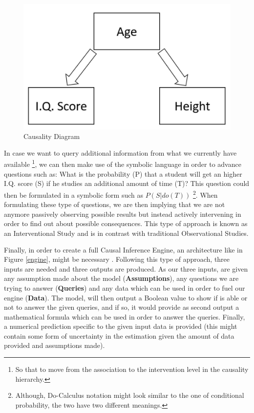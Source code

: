 \begin{figure}[ht!]%
    \centering
    \includegraphics[width=0.4\linewidth]{latex/images/caus_d.pdf}
    \vspace{-0.2cm}
    \caption{Causality Diagram}
    \label{dig_ex}
\end{figure}
\vspace{-0.5cm}

In case we want to query additional information from what we currently have available \footnote{So that to move from the association to the intervention level in the causality hierarchy.}, we can then make use of the symbolic language in order to advance questions such as: What is the probability (P) that a student will get an higher I.Q. score (S) if he studies an additional amount of time (T)? This question could then be formulated in a symbolic form such as $P(S|do(T))$  \footnote{Although, Do-Calculus notation might look similar to the one of conditional probability, the two have two different meanings.}. When formulating these type of questions, we are then implying that we are not anymore passively observing possible results but instead actively intervening in order to find out about possible consequences. This type of approach is known as an Interventional Study and is in contrast with traditional Observational Studies.

Finally, in order to create a full Causal Inference Engine, an architecture like in Figure \ref{engine}, might be necessary \cite{why}. Following this type of approach, three inputs are needed and three outputs are produced. As our three inputs, are given any assumption made about the model (\textbf{Assumptions}), any questions we are trying to answer (\textbf{Queries}) and any data which can be used in order to fuel our engine (\textbf{Data}). The model, will then output a Boolean value to show if is able or not to answer the given queries, and if so, it would provide as second output a mathematical formula which can be used in order to answer the queries. Finally, a numerical prediction specific to the given input data is provided (this might contain some form of uncertainty in the estimation given the amount of data provided and assumptions made).  

